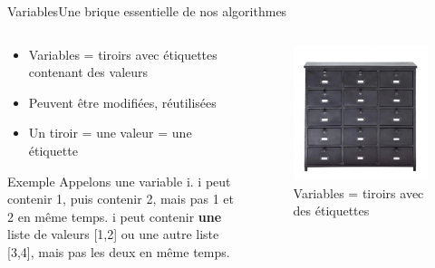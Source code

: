 \documentclass{beamer}
\begin{document}
\begin{frame}{Variables}{Une brique essentielle de nos algorithmes}
	\begin{columns}
		\begin{column}{0.6\textwidth}
			\begin{itemize}
				\item Variables = tiroirs avec étiquettes contenant des valeurs \pause
				\item Peuvent être modifiées, réutilisées \pause
				\item Un tiroir = une valeur = une étiquette \pause
			\end{itemize}
			\begin{exampleblock}{Exemple}
				Appelons une variable i. i peut contenir 1, puis contenir 2, mais pas 1 et 2 en même temps. i peut contenir \textbf{une} liste de valeurs [1,2] ou une autre liste [3,4], mais pas les deux en même temps.
			\end{exampleblock}
		\end{column}
		\begin{column}{0.4\textwidth}
			\begin{figure}
				\includegraphics[width=1\linewidth]{Commode.png}
				\caption{Variables = tiroirs avec des étiquettes}
			\end{figure}
		\end{column}
	\end{columns}
\end{frame}
\end{document}
